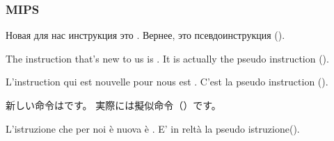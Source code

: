 ﻿\subsubsection{MIPS}

\ifdefined\RUSSIAN


Новая для нас инструкция это . Вернее, это псевдоинструкция ().
\fi

\ifdefined\ENGLISH


The instruction that's new to us is . It is actually the pseudo instruction ().
\fi

\ifdefined\FRENCH


L'instruction qui est nouvelle pour nous est . C'est la pseudo instruction ().
\fi

\ifdefined\JAPANESE


新しい命令はです。 実際には擬似命令（）です。
\fi

\ifdefined\ITALIAN


L'istruzione che per noi è nuova è . E' in reltà la pseudo istruzione().
